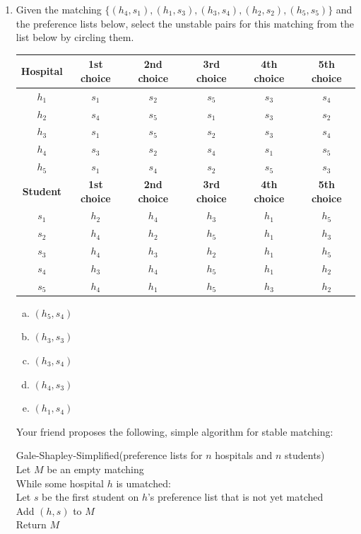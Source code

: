 \documentclass[11pt]{article}
\begin{document}
\begin{enumerate}

\item Given the matching
$\{(h_4, s_1), (h_1, s_3), (h_3, s_4), (h_2, s_2), (h_5, s_5)\}$ and the
preference lists below,
select the unstable pairs for this matching from the list below by circling them.

\begin{table}[h]
\centering
\begin{tabular}{c|ccccc}
\textbf{Hospital} & \textbf{1st choice} & \textbf{2nd choice} & \textbf{3rd choice} & \textbf{4th choice} & \textbf{5th choice} \\
\hline
$h_1$ & $s_1$ & $s_2$ & $s_5$ & $s_3$ & $s_4$ \\
$h_2$ & $s_4$ & $s_5$ & $s_1$ & $s_3$ & $s_2$ \\
$h_3$ & $s_1$ & $s_5$ & $s_2$ & $s_3$ & $s_4$ \\
$h_4$ & $s_3$ & $s_2$ & $s_4$ & $s_1$ & $s_5$ \\
$h_5$ & $s_1$ & $s_4$ & $s_2$ & $s_5$ & $s_3$ \\
\hline
\textbf{Student} & \textbf{1st choice} & \textbf{2nd choice} & \textbf{3rd choice} & \textbf{4th choice} & \textbf{5th choice} \\
\hline
$s_1$ & $h_2$ & $h_4$ & $h_3$ & $h_1$ & $h_5$ \\
$s_2$ & $h_4$ & $h_2$ & $h_5$ & $h_1$ & $h_3$ \\
$s_3$ & $h_4$ & $h_3$ & $h_2$ & $h_1$ & $h_5$ \\
$s_4$ & $h_3$ & $h_4$ & $h_5$ & $h_1$ & $h_2$ \\
$s_5$ & $h_4$ & $h_1$ & $h_5$ & $h_3$ & $h_2$ \\
\end{tabular}
\end{table}

\begin{enumerate}[(a)]
    \item $(h_5, s_4)$
    \item $(h_3, s_3)$
    \item $(h_3, s_4)$
    \item $(h_4, s_3)$
    \item $(h_1, s_4)$
\end{enumerate}
\newpage

Your friend proposes the following, simple algorithm for stable matching:

    \begin{algo}
    Gale-Shapley-Simplified(preference lists for $n$ hospitals and $n$ students)\+\\
    Let $M$ be an empty matching\\
    While some hospital $h$ is umatched:\+ \\
        Let $s$ be the first student on $h$'s preference list that is not yet matched\\
        Add $(h,s)$ to $M$\-\\
    Return $M$\\
    \end{algo}


\end{enumerate}
\end{document}
